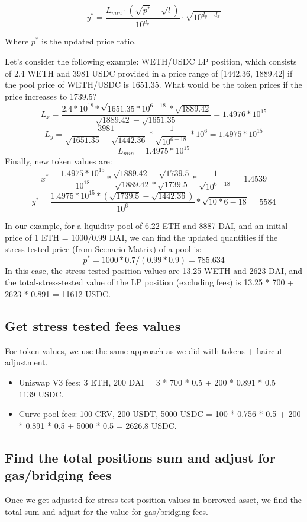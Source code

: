 \documentclass[conference]{IEEEtran}
\begin{document}
$$y^{*} = \frac{L_{min} \cdot (\sqrt{p^{*}} - \sqrt{l})}{10^{d_{y}}}
\cdot \sqrt{10^{d_{y} - d_{x}}}$$

Where $p^{*}$ is the updated price ratio. 

Let's consider the following example: WETH/USDC LP position, which consists of 2.4 WETH and 3981 USDC provided in a price range of [1442.36, 1889.42] if the pool price of WETH/USDC is 1651.35. What would be the token prices if the price increases to 1739.5?
$$L_{x} = \frac{2.4*10^{18}*\sqrt{1651.35*10^{6-18}}*\sqrt{1889.42}}{\sqrt{1889.42} - \sqrt{1651.35}}=1.4976*10^{15}$$
$$L_{y} = \frac{3981}{\sqrt{1651.35}-\sqrt{1442.36}}*\frac{1}{\sqrt{10^{6-18}}}*10^{6}=1.4975*10^{15}$$
$$L_{min}=1.4975*10^{15}$$
Finally, new token values are:
$$x^{*} = \frac{1.4975*10^{15}}{10^{18}}*\frac{\sqrt{1889.42} - \sqrt{1739.5}}{\sqrt{1889.42} * \sqrt{1739.5}}*\frac{1}{\sqrt{10^{6-18}}}=1.4539$$
$$y^{*} = \frac{1.4975*10^{15}*(\sqrt{1739.5}-\sqrt{1442.36})}{10^{6}}*\sqrt{10*{6-18}}=5584$$

In our example, for a liquidity pool of 6.22 ETH and 8887 DAI, and an initial price of 1 ETH = 1000/0.99 DAI, we can find the updated quantities if the stress-tested price (from Scenario Matrix) of a pool is: $$p^{*} = 1000*0.7/(0.99*0.9) = 785.634$$
In this case, the stress-tested position values are 13.25 WETH and 2623 DAI, and the total-stress-tested value of the LP position (excluding fees) is 13.25 * 700 + 2623 * 0.891 = 11612 USDC.

\subsection{Get stress tested fees values}
 For token values, we use the same approach as we did with tokens + haircut adjustment. 
 \begin{itemize}
 	\item Uniswap V3 fees: 3 ETH, 200 DAI = 3 * 700 * 0.5 + 200 * 0.891 * 0.5 = 1139 USDC.
 	\item Curve pool fees: 100 CRV, 200 USDT, 5000 USDC = 100 * 0.756 * 0.5 + 200 * 0.891 * 0.5 + 5000 * 0.5 = 2626.8 USDC.
 \end{itemize}
 
 \subsection{Find the total positions sum and adjust for gas/bridging fees}
 
 Once we get adjusted for stress test position values in borrowed asset, we find the total sum and adjust for the value for gas/bridging fees.
 
\end{document}
